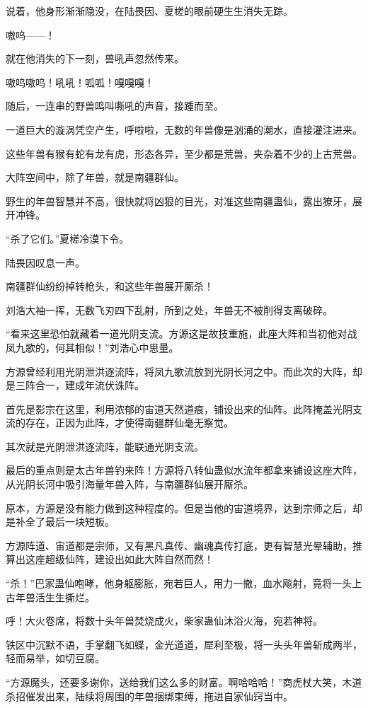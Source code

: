 \begin{this_body}
说着，他身形渐渐隐没，在陆畏因、夏槎的眼前硬生生消失无踪。

嗷呜——！

就在他消失的下一刻，兽吼声忽然传来。

嗷呜嗷呜！吼吼！呱呱！嘎嘎嘎！

随后，一连串的野兽鸣叫嘶吼的声音，接踵而至。

一道巨大的漩涡凭空产生，呼啦啦，无数的年兽像是汹涌的潮水，直接灌注进来。

这些年兽有猴有蛇有龙有虎，形态各异，至少都是荒兽，夹杂着不少的上古荒兽。

大阵空间中，除了年兽，就是南疆群仙。

野生的年兽智慧并不高，很快就将凶狠的目光，对准这些南疆蛊仙，露出獠牙，展开冲锋。

“杀了它们。”夏槎冷漠下令。

陆畏因叹息一声。

南疆群仙纷纷掉转枪头，和这些年兽展开厮杀！

刘浩大袖一挥，无数飞刃四下乱射，所到之处，年兽无不被削得支离破碎。

“看来这里恐怕就藏着一道光阴支流。方源这是故技重施，此座大阵和当初他对战凤九歌的，何其相似！”刘浩心中思量。

方源曾经利用光阴泄洪逐流阵，将凤九歌流放到光阴长河之中。而此次的大阵，却是三阵合一，建成年流伏诛阵。

首先是影宗在这里，利用浓郁的宙道天然道痕，铺设出来的仙阵。此阵掩盖光阴支流的存在，正因为此阵，才使得南疆群仙毫无察觉。

其次就是光阴泄洪逐流阵，能联通光阴支流。

最后的重点则是太古年兽钓来阵！方源将八转仙蛊似水流年都拿来铺设这座大阵，从光阴长河中吸引海量年兽入阵，与南疆群仙展开厮杀。

原本，方源是没有能力做到这种程度的。但是当他的宙道境界，达到宗师之后，却是补全了最后一块短板。

方源阵道、宙道都是宗师，又有黑凡真传、幽魂真传打底，更有智慧光晕辅助，推算出这座超级仙阵，建设出如此大阵自然而然！

“杀！”巴家蛊仙咆哮，他身躯膨胀，宛若巨人，用力一撤，血水飚射，竟将一头上古年兽活生生撕烂。

呼！大火卷席，将数十头年兽焚烧成火，柴家蛊仙沐浴火海，宛若神将。

铁区中沉默不语，手掌翻飞如蝶，金光道道，犀利至极，将一头头年兽斩成两半，轻而易举，如切豆腐。

“方源魔头，还要多谢你，送给我们这么多的财富。啊哈哈哈！”商虎杖大笑，木道杀招催发出来，陆续将周围的年兽捆绑束缚，拖进自家仙窍当中。


\end{this_body}

